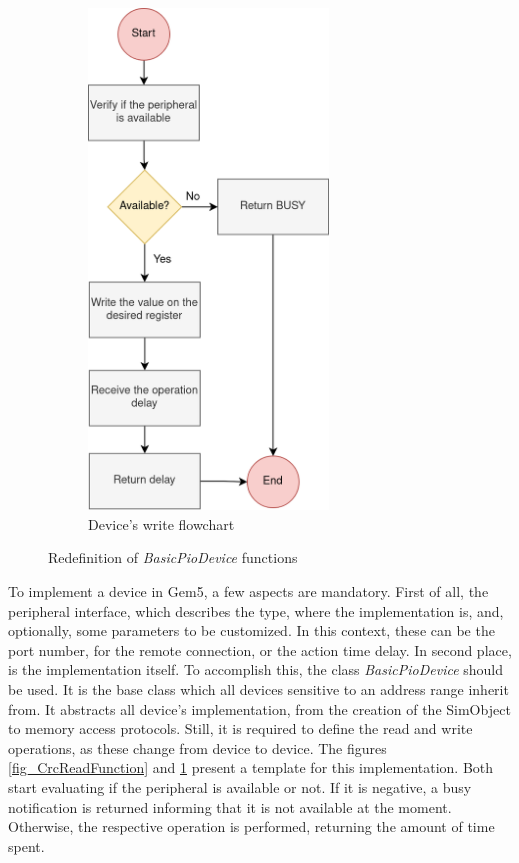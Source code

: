 \begin{figure}[t!]
\begin{subfigure}{0.4\textwidth}
		\includegraphics[width=0.7\textwidth]{Images/CrcWriteFunction.png}
		\caption[1\textwidth]{Device's write flowchart}
		\label{fig_CrcWriteFunction}
	\end{subfigure}
		
	\caption{Redefinition of \textit{BasicPioDevice} functions}
	\label{fig_Gem5ReadWrite}
\end{figure}
 
To implement a device in Gem5, a few aspects are mandatory. First of all, the peripheral interface, which describes the type, 
where the implementation is, and, optionally, some parameters to be customized. In this context, these can be
the port number, for the remote connection, or the action time delay. 
In second place, is the implementation itself. To accomplish this, the class \textit{BasicPioDevice} should be used. It is the base class 
which all devices sensitive to an address range inherit from. It abstracts all device's implementation, from the creation of the SimObject 
to memory access protocols. Still, it is required to define the read and write operations, as these change from device to device. 
The figures \ref{fig_CrcReadFunction} and \ref{fig_CrcWriteFunction} present a template for this implementation. Both start evaluating if
the peripheral is available or not. If it is negative, a busy notification is returned informing that it is not available at the 
moment. Otherwise, the respective operation is performed, returning the amount of time spent.

